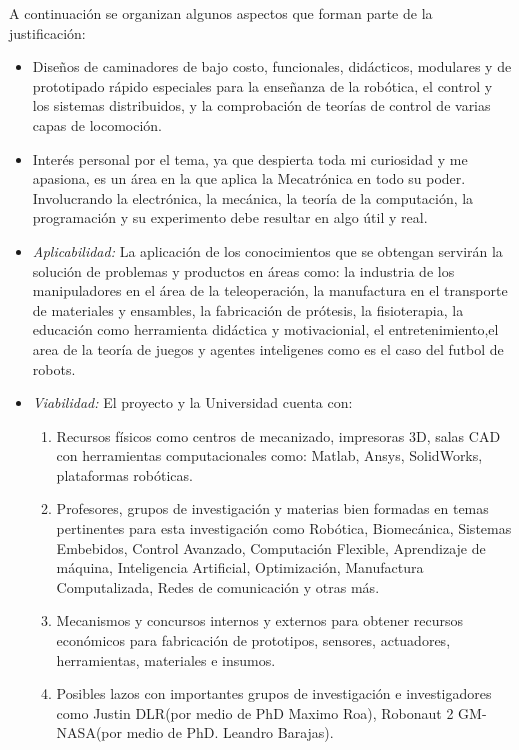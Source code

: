 \documentclass[12pt,twoside,onecolumn,letterpaper]{article}
\begin{document}
A continuaci\'on se organizan algunos aspectos que forman parte de la justificaci\'on:
\begin{itemize}
\item Dise\~nos de caminadores de bajo costo, funcionales, did\'acticos, modulares y de prototipado r\'apido especiales para la ense\~nanza de la rob\'otica, el control y los sistemas distribuidos, y la comprobaci\'on de teor\'ias de control de varias capas de locomoci\'on.
\item Inter\'es personal por el tema, ya que despierta toda mi curiosidad y me apasiona, es un \'area en la que aplica la Mecatr\'onica en todo su poder. Involucrando la electr\'onica, la mec\'anica, la teor\'ia de la computaci\'on, la programaci\'on y su experimento debe resultar en algo \'util y real\cite{Castillo2007,Castillo2008,Castillo2010}.
\item \emph{Aplicabilidad:} La aplicaci\'on de los conocimientos que se obtengan servir\'an la soluci\'on de problemas y productos en \'areas como: la industria de los manipuladores en el \'area de la teleoperaci\'on\cite{Treesatayapun2014,M2013}, la manufactura en el transporte de materiales y ensambles\cite{Roy2013}, la fabricaci\'on de pr\'otesis\cite{Roa2006}, la fisioterapia\cite{Kang2013}, la educaci\'on como herramienta did\'actica y motivacionial\cite{Ishida2004}, el entretenimiento,el area de la teor\'ia de juegos y agentes inteligenes como es el caso del futbol de robots\cite{Ishida2004}.
\item \emph{Viabilidad:} El proyecto y la Universidad cuenta con: 
  \begin{enumerate}[1)]
  \item Recursos f\'isicos como centros de mecanizado, impresoras 3D, salas CAD con herramientas computacionales como: Matlab, Ansys, SolidWorks, plataformas rob\'oticas.
  \item Profesores, grupos de investigaci\'on y materias bien formadas en temas pertinentes para esta investigaci\'on como Rob\'otica, Biomec\'anica, Sistemas Embebidos, Control Avanzado, Computaci\'on Flexible, Aprendizaje de m\'aquina, Inteligencia Artificial, Optimizaci\'on, Manufactura Computalizada, Redes de comunicaci\'on y otras m\'as.
  \item  Mecanismos y concursos internos y externos para obtener recursos econ\'omicos para fabricaci\'on de prototipos, sensores, actuadores, herramientas, materiales e insumos.
  \item Posibles lazos con importantes grupos de investigaci\'on e investigadores como Justin DLR(por medio de PhD Maximo Roa), Robonaut 2 GM-NASA(por medio de PhD. Leandro Barajas).

\end{enumerate}
\end{itemize}
\end{document}
